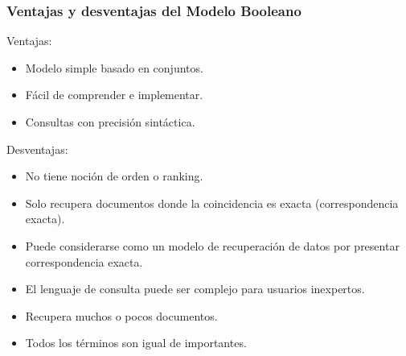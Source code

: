 \documentclass[
10pt, %
aspectratio=169, %
]{beamer}
\begin{document}
	\begin{frame}
		
		\frametitle{Ventajas y desventajas del Modelo Booleano}
				
		Ventajas:
		\begin{itemize}
		
			\item Modelo simple basado en conjuntos.
			
			\item Fácil de comprender e implementar.
			
			\item Consultas con precisión sintáctica.
		
		\end{itemize}
	
		\vspace{2\baselineskip}
		
		\pause 
		
		Desventajas:
		\begin{itemize}
		
			\item No tiene noción de orden o ranking.
		
			\item Solo recupera documentos donde la coincidencia es exacta (correspondencia exacta).
		
			\item Puede considerarse como un modelo de recuperación de datos por presentar correspondencia exacta.
		
			\item El lenguaje de consulta puede ser complejo para usuarios inexpertos.
		
			\item Recupera muchos o pocos documentos.
			
			\item Todos los términos son igual de importantes.
		
		\end{itemize}
		
	\end{frame}
	
\end{document}
